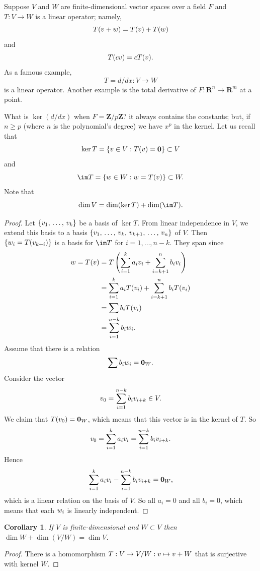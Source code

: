 \documentclass[11pt, oneside]{amsart}
\numberwithin{equation}{section}
\numberwithin{theorem}{section}
\newtheorem{corollary}[theorem]{Corollary}
\theoremstyle{definition}
\let\bf\relax
\def\Z{\mathbf{Z}}
\def\R{\mathbf{R}}
\def\0{\mathbf{0}}
\begin{document}
Suppose $V$ and $W$ are finite-dimensional vector spaces over a field $F$ and $T:V\to W$ is a linear operator; namely, 
$$
T(\bf{v} + \bf w ) = T(\bf v) + T(\bf w)
$$  
and 
$$
T(c\bf v) = cT(\bf v).
$$
As a famous example, 
$$
T = d/dx : V\to W
$$
is a linear operator. Another example is the total derivative of $F:\R^n \to \R^m$ at a point.

What is $\ker(d/dx)$ when $F = \Z/p\Z$? it always contains the constants; but, if $n\geqslant p$ (where $n$ is the polynomial's degree) we have $x^p$ in the kernel. Let us recall that 
$$
\ker T = \{ \bf v \in V : T(\bf v) = \0 \} \subset V
$$
and
$$
\im T = \{  \bf w \in W : \bf w = T(\bf v)\} \subset W.
$$
Note that
$$
\dim V = \dim (\ker T) + \dim (\im T).
$$
\begin{proof}
Let $\{\bf v_1,\,\hdots,\, \bf v_k\}$ be a basis of $\ker T$. From linear independence in $V$, we extend this basis to a basis $\{\bf v_1,\,\hdots,\, \bf v_k,\,\bf v_{k+1},\,\hdots,\,\bf v_n\}$ of $V$. Then $\{\bf w_i = T(\bf v_{k+i})\}$ is a basis for $\im T$ for $i = 1,\hdots,n-k$. They span since 
\begin{align*}
\bf w = T(\bf v)  &= T\left(\sum_{i=1}^ka_i\bf v_i + \sum_{i=k+1}^nb_i\bf v_i\right)\\
			&= \sum_{i=1}^ka_iT(\bf v_i) + \sum_{i=k+1}^nb_iT(\bf v_i)\\
			&= \sum b_iT(\bf v_i)\\
			&= \sum_{i=1}^{n-k} b_i\bf w_i.
\end{align*}
Assume that there is a relation
$$
\sum b_i\bf w_i = \0_W.
$$
Consider the vector
$$
\bf{v}_0 = \sum_{i=1}^{n-k}b_i\bf v_{i+k} \in V.
$$
We claim that $T(\bf v_0) = \0_W$, which means that this vector is in the kernel of $T$. So
\begin{align*}
\bf v_0 = \sum_{i=1}^k a_i\bf v_i = \sum_{i=1}^{n-k} b_i\bf v_{i+k}.
\end{align*}
Hence
\begin{align*}
 \sum_{i=1}^k a_i\bf v_i - \sum_{i=1}^{n-k} b_i\bf v_{i+k} = \0_W,
\end{align*}
which is a linear relation on the basis of $V$. So all $a_i = 0$ and all $b_i=0$, which means that each $\bf w_i$ is linearly independent. 
\end{proof}
\begin{corollary}
If $V$ is finite-dimensional and $W\subset V$ then $\dim W + \dim(V/W) = \dim V$.
\end{corollary}
\begin{proof}
There is a homomorphism $T:V\to V/W:\bf v\mapsto \bf v + W$ that is surjective with kernel $W$.
\end{proof}
\end{document}
